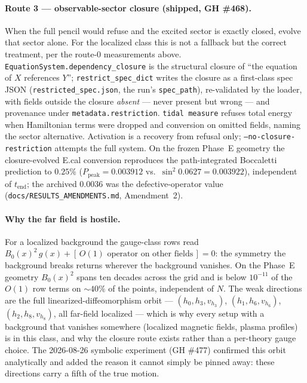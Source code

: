 \paragraph{Route 3 --- observable-sector closure (shipped, GH \#468).}
When the full pencil would refuse and the excited sector is exactly
closed, evolve that sector alone. For the localized class this is not a
fallback but the correct treatment, per the route-0 measurements above. \texttt{EquationSystem.dependency\_closure}
is the structural closure of ``the equation of $X$ references $Y$'';
\texttt{restrict\_spec\_dict} writes the closure as a first-class spec
JSON (\texttt{restricted\_spec.json}, the run's \texttt{spec\_path}),
re-validated by the loader, with fields outside the closure
\emph{absent} --- never present but wrong --- and provenance under
\texttt{metadata.restriction}. \texttt{tidal measure} refuses total energy
when Hamiltonian terms were dropped and conversion on omitted fields,
naming the sector alternative. Activation is a recovery from refusal
only; \texttt{--no-closure-restriction} attempts the full system. On the
frozen Phase~E geometry the closure-evolved E.cal conversion reproduces
the path-integrated Boccaletti prediction to $0.25\%$
($P_\text{peak} = 0.003912$ vs.\ $\sin^2 0.0627 = 0.003922$),
independent of $t_\text{end}$; the archived $0.0036$ was the
defective-operator value (\texttt{docs/RESULTS\_AMENDMENTS.md},
Amendment~2).

\paragraph{Why the far field is hostile.} For a localized background the
gauge-class rows read $B_0(x)^2\, g(x) + [\,O(1)\text{ operator on other
fields}\,] = 0$: the symmetry the background breaks returns wherever the
background vanishes. On the Phase~E geometry $B_0(x)^2$ spans ten decades
across the grid and is below $10^{-11}$ of the $O(1)$ row terms on
$\sim\!40\%$ of the points, independent of $N$. The weak directions are
the full linearized-diffeomorphism orbit --- $(h_0, h_3, v_{h_3})$,
$(h_1, h_6, v_{h_6})$, $(h_2, h_8, v_{h_8})$, all far-field localized ---
which is why every setup with a background that vanishes somewhere
(localized magnetic fields, plasma profiles) is in this class, and why
the closure route exists rather than a per-theory gauge choice. The
2026-08-26 symbolic experiment (GH \#477) confirmed this orbit
analytically and added the reason it cannot simply be pinned away: these
directions carry a fifth of the true motion.

